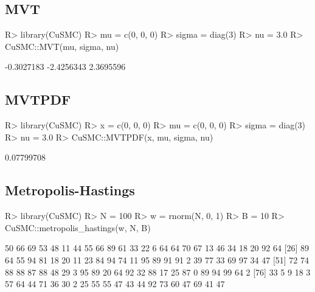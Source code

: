 \documentclass[
]{jss}
\begin{document}
\hypertarget{mvt}{%
\subsection{MVT}\label{mvt}}

\begin{CodeChunk}

\begin{CodeInput}
R> library(CuSMC)
R> mu = c(0, 0, 0)
R> sigma = diag(3)
R> nu = 3.0
R> CuSMC::MVT(mu, sigma, nu)
\end{CodeInput}

\begin{CodeOutput}
[1] -0.3027183 -2.4256343  2.3695596
\end{CodeOutput}
\end{CodeChunk}

\hypertarget{mvtpdf}{%
\subsection{MVTPDF}\label{mvtpdf}}

\begin{CodeChunk}

\begin{CodeInput}
R> library(CuSMC)
R> x = c(0, 0, 0)
R> mu = c(0, 0, 0)
R> sigma = diag(3)
R> nu = 3.0
R> CuSMC::MVTPDF(x, mu, sigma, nu)
\end{CodeInput}

\begin{CodeOutput}
[1] 0.07799708
\end{CodeOutput}
\end{CodeChunk}

\hypertarget{metropolis-hastings}{%
\subsection{Metropolis-Hastings}\label{metropolis-hastings}}

\begin{CodeChunk}

\begin{CodeInput}
R> library(CuSMC)
R> N = 100
R> w = rnorm(N, 0, 1)
R> B = 10
R> CuSMC::metropolis_hastings(w, N, B)
\end{CodeInput}

\begin{CodeOutput}
  [1] 50 66 69 53 48 11 44 55 66 89 61 33 22  6 64 64 70 67 13 46 34 18 20 92 64
 [26] 89 64 55 94 81 18 20 11 23 84 94 74 11 95 89 91 91  2 39 77 33 69 97 34 47
 [51] 72 74 88 88 87 88 48 29  3 95 89 20 64 92 32 88 17 25 87  0 89 94 99 64  2
 [76] 33  5  9 18  3 57 64 44 71 36 30  2 25 55 55 47 43 44 92 73 60 47 69 41 47
\end{CodeOutput}
\end{CodeChunk}
\end{document}
